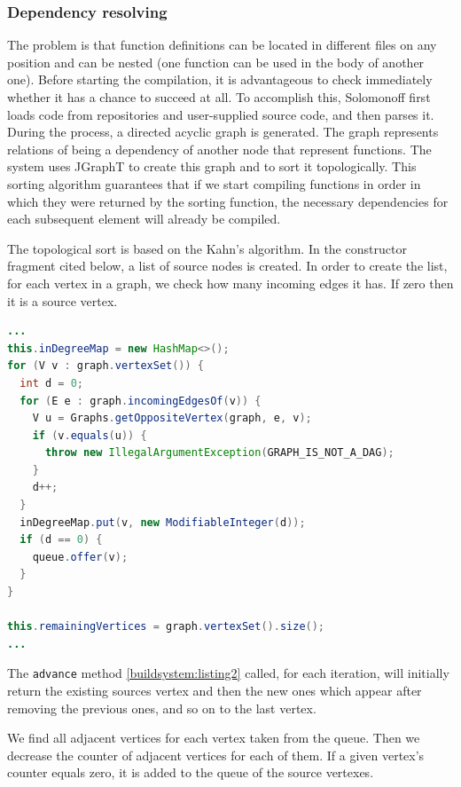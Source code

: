 \hypertarget{dependency-resolving}{%
\subsubsection{Dependency resolving}\label{dependency-resolving}}

The problem is that function definitions can be located in different
files on any position and can be nested (one function can be
used in the body of another one). Before starting the compilation, it is
advantageous to check immediately whether it has a chance to succeed at all. To
accomplish this, Solomonoff first loads code from repositories and
user-supplied source code, and then parses it. During the process,
a directed acyclic graph is
generated. The graph represents relations of being a dependency of
another node that represent functions. The system uses JGraphT to create
this graph and to sort it topologically.
This sorting algorithm guarantees that if we start compiling functions
in order in which they were returned by the sorting function,
the necessary dependencies for each subsequent element will already
be compiled.

The topological sort is based on the Kahn's algorithm.
In the constructor fragment cited below, a list of source nodes is
created.
In order to create the list, for each vertex in a graph, we check how many incoming edges it has.
If zero then it is a source vertex.

\begin{lstlisting}[language=Java, caption={Kahn's algorithm 1}, label={buildsystem:listing1}, caption={%
  Implementation of the algorithm from the JGraphT library pt. 1 \cite{JGRAPHT}%
}]
...
this.inDegreeMap = new HashMap<>();
for (V v : graph.vertexSet()) {
  int d = 0;
  for (E e : graph.incomingEdgesOf(v)) {
    V u = Graphs.getOppositeVertex(graph, e, v);
    if (v.equals(u)) {
      throw new IllegalArgumentException(GRAPH_IS_NOT_A_DAG);
    }
    d++;
  }
  inDegreeMap.put(v, new ModifiableInteger(d));
  if (d == 0) {
    queue.offer(v);
  }
}

this.remainingVertices = graph.vertexSet().size();
...
\end{lstlisting}

The \texttt{advance} method \ref{buildsystem:listing2} called, for each iteration, will initially return the
existing sources vertex and then the new ones which appear after
removing the previous ones, and so on to the last vertex.

We find all adjacent vertices for each vertex taken from the queue.
Then we decrease the counter of adjacent vertices for each of them.
If a given vertex's counter equals zero, it is added to the queue of the source vertexes.


